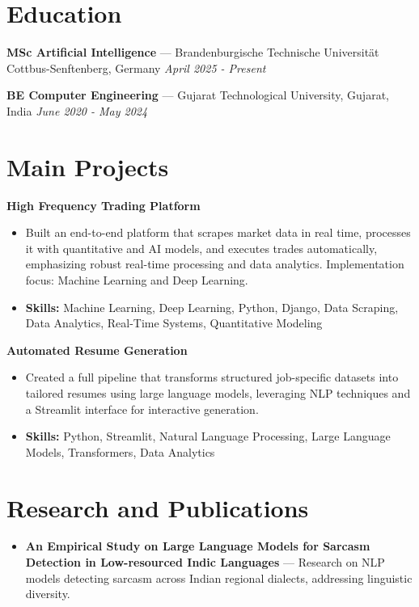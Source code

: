 \documentclass[a4paper,10pt]{article}
\begin{document}
\section*{Education}
\textbf{MSc Artificial Intelligence} — Brandenburgische Technische Universität Cottbus-Senftenberg, Germany \hfill \textit{April 2025 - Present}\par
\vspace{1.5pt}
\textbf{BE Computer Engineering} — Gujarat Technological University, Gujarat, India \hfill \textit{June 2020 - May 2024}\par

\section*{Main Projects}
\textbf{High Frequency Trading Platform}\par
\vspace{1pt}
\begin{itemize}
  \item Built an end-to-end platform that scrapes market data in real time, processes it with quantitative and AI models, and executes trades automatically, emphasizing robust real-time processing and data analytics. Implementation focus: Machine Learning and Deep Learning.
  \item \textbf{Skills:} Machine Learning, Deep Learning, Python, Django, Data Scraping, Data Analytics, Real-Time Systems, Quantitative Modeling
\end{itemize}
\vspace{3pt}
\textbf{Automated Resume Generation}\par
\vspace{1pt}
\begin{itemize}
  \item Created a full pipeline that transforms structured job-specific datasets into tailored resumes using large language models, leveraging NLP techniques and a Streamlit interface for interactive generation.
  \item \textbf{Skills:} Python, Streamlit, Natural Language Processing, Large Language Models, Transformers, Data Analytics
\end{itemize}

\section*{Research and Publications}
\begin{itemize}
\item \textbf{An Empirical Study on Large Language Models for Sarcasm Detection in Low-resourced Indic Languages} — Research on NLP models detecting sarcasm across Indian regional dialects, addressing linguistic diversity.
\end{itemize}
\end{document}

